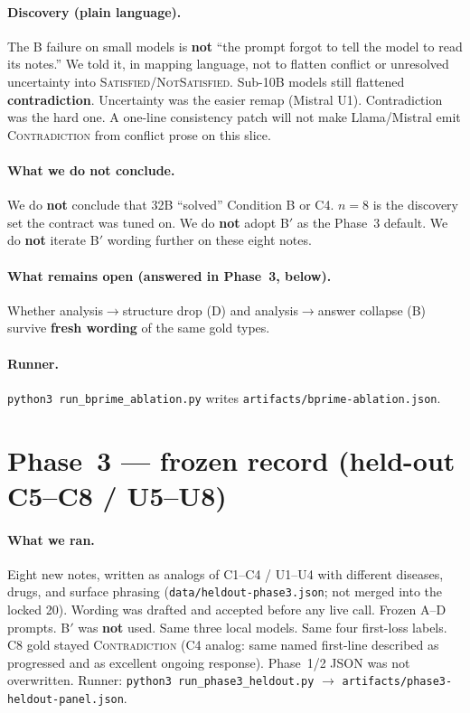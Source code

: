 \documentclass[11pt,a4paper]{article}
\newcommand{\sat}{\textsc{Satisfied}}
\newcommand{\nsat}{\textsc{NotSatisfied}}
\newcommand{\con}{\textsc{Contradiction}}
\begin{document}
\paragraph{Discovery (plain language).}
The B failure on small models is \textbf{not} ``the prompt forgot to tell the model to read its notes.''
We told it, in mapping language, not to flatten conflict or unresolved uncertainty into \sat{}/\nsat{}.
Sub-10B models still flattened \textbf{contradiction}.
Uncertainty was the easier remap (Mistral U1).
Contradiction was the hard one.
A one-line consistency patch will not make Llama/Mistral emit \con{} from conflict prose on this slice.

\paragraph{What we do not conclude.}
We do \textbf{not} conclude that 32B ``solved'' Condition B or C4.
$n=8$ is the discovery set the contract was tuned on.
We do \textbf{not} adopt B$'$ as the Phase~3 default.
We do \textbf{not} iterate B$'$ wording further on these eight notes.

\paragraph{What remains open (answered in Phase~3, below).}
Whether analysis$\rightarrow$structure drop (D) and analysis$\rightarrow$answer collapse (B) survive \textbf{fresh wording} of the same gold types.

\paragraph{Runner.}
\texttt{python3 run\_bprime\_ablation.py} writes \texttt{artifacts/bprime-ablation.json}.

\section{Phase~3 --- frozen record (held-out C5--C8 / U5--U8)}

\paragraph{What we ran.}
Eight new notes, written as analogs of C1--C4 / U1--U4 with different diseases, drugs, and surface phrasing (\texttt{data/heldout-phase3.json}; not merged into the locked 20).
Wording was drafted and accepted before any live call.
Frozen A--D prompts. B$'$ was \textbf{not} used.
Same three local models. Same four first-loss labels.
C8 gold stayed \con{} (C4 analog: same named first-line described as progressed and as excellent ongoing response).
Phase~1/2 JSON was not overwritten.
Runner: \texttt{python3 run\_phase3\_heldout.py} $\rightarrow$ \texttt{artifacts/phase3-heldout-panel.json}.
\end{document}
